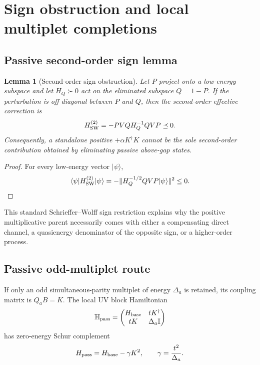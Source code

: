 \documentclass[11pt]{article}
\newtheorem{lemma}[theorem]{Lemma}
\theoremstyle{definition}
\theoremstyle{remark}
\newcommand{\Id}{\mathbb I}
\newcommand{\ket}[1]{\lvert #1\rangle}
\newcommand{\bra}[1]{\langle #1\rvert}
\newcommand{\norm}[1]{\lVert #1\rVert}
\begin{document}
\section{Sign obstruction and local multiplet completions}
\label{sec:sign-local}

\subsection{Passive second-order sign lemma}

\begin{lemma}[Second-order sign obstruction]
\label{lem:sign}
Let $P$ project onto a low-energy subspace and let $H_Q\succ0$ act on the eliminated subspace $Q=1-P$.  If the perturbation is off diagonal between $P$ and $Q$, then the second-order effective correction is
\begin{equation}
 H_{\rm SW}^{(2)}=-PVQH_Q^{-1}QVP\preceq0.
 \label{eq:SW-sign}
\end{equation}
Consequently, a standalone positive $+\alpha K^\dagger K$ cannot be the sole second-order contribution obtained by eliminating passive above-gap states.
\end{lemma}

\begin{proof}
For every low-energy vector $\ket\psi$,
\begin{equation}
 \bra\psi H_{\rm SW}^{(2)}\ket\psi
 =-\norm{H_Q^{-1/2}QVP\ket\psi}^2\le0.
\end{equation}
\end{proof}

This standard Schrieffer--Wolff sign restriction \cite{Schrieffer1966} explains why the positive multiplicative parent necessarily comes with either a compensating direct channel, a quasienergy denominator of the opposite sign, or a higher-order process.

\subsection{Passive odd-multiplet route}

If only an odd simultaneous-parity multiplet of energy $\Delta_a$ is retained, its coupling matrix is $Q_aB=K$.  The local UV block Hamiltonian
\begin{equation}
 \mathbb H_{\rm pass}=
 \begin{pmatrix}
 H_{\rm base}&tK^\dagger\\
 tK&\Delta_a\Id
 \end{pmatrix}
\end{equation}
has zero-energy Schur complement
\begin{equation}
 H_{\rm pass}=H_{\rm base}-\gamma K^2,
 \qquad \gamma=\frac{t^2}{\Delta_a}.
 \label{eq:passive-eff}
\end{equation}
\end{document}
